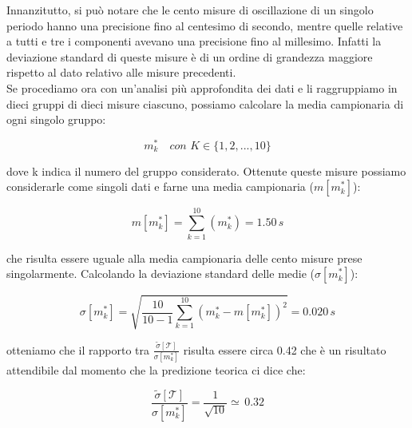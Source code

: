 Innanzitutto, si può notare che le cento misure di oscillazione di un singolo periodo hanno una precisione fino al centesimo di secondo, mentre quelle relative a tutti e tre i componenti avevano una precisione fino al millesimo. Infatti la deviazione standard di queste misure è di un ordine di grandezza maggiore rispetto al dato relativo alle misure precedenti.\\
Se procediamo ora con un'analisi più approfondita dei dati e li raggruppiamo in dieci gruppi di dieci misure ciascuno, possiamo calcolare la media campionaria di ogni singolo gruppo:

\begin{equation}
m_k^* \quad con \,\, K \in{\{1,2,...,10\}}
\end{equation}

dove k indica il numero del gruppo considerato.
Ottenute queste misure possiamo considerarle come singoli dati e farne una media campionaria ($ m[m_k^*] $):

\begin{equation}
m[m_k^*] = \sum_{k=1}^{10} (m_k^*) = 1.50\,s
\end{equation}

che risulta essere uguale alla media campionaria delle cento misure prese singolarmente. Calcolando la deviazione standard delle medie ($ \sigma[m_k^*] $):

\begin{equation}
\sigma[m_k^*] = \sqrt{\frac{10}{10-1} \sum_{k=1}^{10} (m_k^* - m[m_k^*])^2} = 0.020\,s
\end{equation}

otteniamo che il rapporto tra $\frac{\tilde{\sigma}[\mathcal{T}]}{\sigma[m_k^*]}$ risulta essere circa 0.42 che è un risultato attendibile dal momento che la predizione teorica ci dice che:

\begin{equation}
\frac{\tilde{\sigma}[\mathcal{T}]}{\sigma[m_k^*]} = \frac{1}{\sqrt{10}} \simeq \, 0.32
\end{equation}

